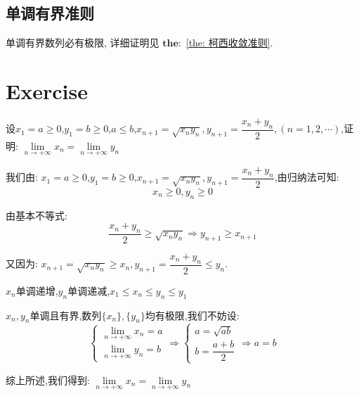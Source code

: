 \subsection{单调有界准则}
\begin{definition}[单调有界准则]
	单调有界数列必有极限, 详细证明见 $\mathbf{the:}$ \ref{the: 柯西收敛准则}.
\end{definition}
\section{Exercise}
\begin{proposition}
	设$x_{1}=a\geq 0$,$y_{1}=b\geq 0$,$a\leq b$,$x_{n+1}=\sqrt{x_{n}y_{n}},y_{n+1}=\dfrac{x_{n}+y_{n}}{2},(n=1,2,\cdots)$,证明:  $\lim\limits_{n\rightarrow +\infty}x_{n}=\lim\limits_{n\rightarrow +\infty}y_{n}$
\end{proposition}
\begin{solution}
	
	我们由:  $x_{1}=a\geq 0$,$y_{1}=b\geq 0$,$x_{n+1}=\sqrt{x_{n}y_{n}},y_{n+1}=\dfrac{x_{n}+y_{n}}{2}$,由归纳法可知:  
	$$x_{n}\geq 0, y_{n}\geq 0$$
	
	由基本不等式:  
	$$\dfrac{x_{n}+y_{n}}{2}\geq \sqrt{x_{n}y_{n}}\Rightarrow y_{n+1}\geq x_{n+1}$$
	
	又因为:  $x_{n+1}=\sqrt{x_{n}y_{n}}\geq x_{n}, y_{n+1}=\dfrac{x_{n}+y_{n}}{2}\leq y_{n}$.
	
	$x_{n}$单调递增,$y_{n}$单调递减,$x_{1}\leq x_{n}\leq y_{n}\leq y_{1}$
	
	$x_{n},y_{n}$单调且有界,数列$\{x_{n}\},\{y_{n}\}$均有极限,我们不妨设:  
	$$\left\lbrace
	\begin{array}{l}
		\lim\limits_{n\rightarrow +\infty}x_{n}=a\\
		\lim\limits_{n\rightarrow +\infty}y_{n}=b
	\end{array}
	\right. \Rightarrow \left\lbrace
	\begin{array}{l}
		a=\sqrt{ab}\\
		b=\dfrac{a+b}{2}
	\end{array}
	\right. \Rightarrow a=b$$
	
	综上所述,我们得到:  $\lim\limits_{n\rightarrow +\infty}x_{n}=\lim\limits_{n\rightarrow +\infty}y_{n}$
\end{solution}

